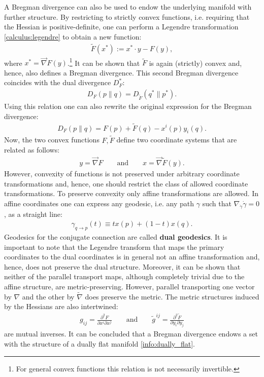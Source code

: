     A Bregman divergence can also be used to endow the underlying manifold with further structure. By restricting to strictly convex functions, i.e. requiring that the Hessian is positive-definite, one can perform a Legendre transformation \ref{calculus:legendre} to obtain a new function:
    \begin{gather}
        \label{info:legendre}
        \widetilde{F}(x^*) := x^*\cdot y - F(y),
    \end{gather}
    where $x^*=\vec{\nabla}F(y)$.\footnote{For general convex functions this relation is not necessarily invertible.} It can be shown that $\widetilde{F}$ is again (strictly) convex and, hence, also defines a Bregman divergence. This second Bregman divergence coincides with the dual divergence $D_F^*$:
    \begin{gather}
        D_F(p\|q) = D_{\widetilde{F}}(q^*\|p^*).
    \end{gather}
    Using this relation one can also rewrite the original expression for the Bregman divergence:
    \begin{gather}
        D_F(p\|q) = F(p) + \widetilde{F}(q) - x^i(p)y_i(q).
    \end{gather}
    Now, the two convex functions $F,\widetilde{F}$ define two coordinate systems that are related as follows:
    \begin{gather}
        y=\vec{\nabla}F\qquad\text{and}\qquad x=\vec{\nabla}\widetilde{F}(y).
    \end{gather}
    However, convexity of functions is not preserved under arbitrary coordinate transformations and, hence, one should restrict the class of allowed coordinate transformations. To preserve convexity only affine transformations are allowed. In affine coordinates one can express any geodesic, i.e. any path $\gamma$ such that $\nabla_{\dot{\gamma}}\dot{\gamma}=0$, as a straight line:
    \begin{gather}
        \gamma_{q\rightarrow p}(t) \equiv tx(p) + (1-t)x(q).
    \end{gather}
    Geodesics for the conjugate connection are called \textbf{dual geodesics}. It is important to note that the Legendre transform that maps the primary coordinates to the dual coordinates is in general not an affine transformation and, hence, does not preserve the dual structure. Moreover, it can be shown that neither of the parallel transport maps, although completely trivial due to the affine structure, are metric-preserving. However, parallel transporting one vector by $\nabla$ and the other by $\widetilde{\nabla}$ does preserve the metric. The metric structures induced by the Hessians are also intertwined:
    \begin{gather}
        \label{info:bregman_metric}
        g_{ij} = \frac{\partial^2F}{\partial x^i\partial x^j}\qquad\text{and}\qquad \widetilde{g}^{\,ij} = \frac{\partial^2\widetilde{F}}{\partial y_i\partial y_j}
    \end{gather}
    are mutual inverses. It can be concluded that a Bregman divergence endows a set with the structure of a dually flat manifold \ref{info:dually_flat}.

